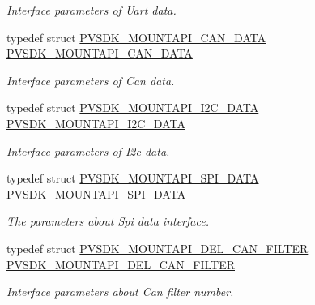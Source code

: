 \begin{DoxyCompactItemize}
\begin{DoxyCompactList}\small\item\em Interface parameters of Uart data. \end{DoxyCompactList}\item 
typedef struct \hyperlink{struct_p_v_s_d_k___m_o_u_n_t_a_p_i___c_a_n___d_a_t_a}{P\+V\+S\+D\+K\+\_\+\+M\+O\+U\+N\+T\+A\+P\+I\+\_\+\+C\+A\+N\+\_\+\+D\+A\+TA} \hyperlink{group___p_v_s_d_k___c_o_r_e___a_p_i___m_o_u_n_t_c_o_n_t_r_o_l_gab3b760a5b4221e28642d202e8d1b1d39}{P\+V\+S\+D\+K\+\_\+\+M\+O\+U\+N\+T\+A\+P\+I\+\_\+\+C\+A\+N\+\_\+\+D\+A\+TA}
\begin{DoxyCompactList}\small\item\em Interface parameters of Can data. \end{DoxyCompactList}\item 
typedef struct \hyperlink{struct_p_v_s_d_k___m_o_u_n_t_a_p_i___i2_c___d_a_t_a}{P\+V\+S\+D\+K\+\_\+\+M\+O\+U\+N\+T\+A\+P\+I\+\_\+\+I2\+C\+\_\+\+D\+A\+TA} \hyperlink{group___p_v_s_d_k___c_o_r_e___a_p_i___m_o_u_n_t_c_o_n_t_r_o_l_gaae12ef2e7bfbb4f7540409242ed7f07f}{P\+V\+S\+D\+K\+\_\+\+M\+O\+U\+N\+T\+A\+P\+I\+\_\+\+I2\+C\+\_\+\+D\+A\+TA}
\begin{DoxyCompactList}\small\item\em Interface parameters of I2c data. \end{DoxyCompactList}\item 
typedef struct \hyperlink{struct_p_v_s_d_k___m_o_u_n_t_a_p_i___s_p_i___d_a_t_a}{P\+V\+S\+D\+K\+\_\+\+M\+O\+U\+N\+T\+A\+P\+I\+\_\+\+S\+P\+I\+\_\+\+D\+A\+TA} \hyperlink{group___p_v_s_d_k___c_o_r_e___a_p_i___m_o_u_n_t_c_o_n_t_r_o_l_ga75ead11880120116504f69f893e91355}{P\+V\+S\+D\+K\+\_\+\+M\+O\+U\+N\+T\+A\+P\+I\+\_\+\+S\+P\+I\+\_\+\+D\+A\+TA}
\begin{DoxyCompactList}\small\item\em The parameters about Spi data interface. \end{DoxyCompactList}\item 
typedef struct \hyperlink{struct_p_v_s_d_k___m_o_u_n_t_a_p_i___d_e_l___c_a_n___f_i_l_t_e_r}{P\+V\+S\+D\+K\+\_\+\+M\+O\+U\+N\+T\+A\+P\+I\+\_\+\+D\+E\+L\+\_\+\+C\+A\+N\+\_\+\+F\+I\+L\+T\+ER} \hyperlink{group___p_v_s_d_k___c_o_r_e___a_p_i___m_o_u_n_t_c_o_n_t_r_o_l_ga4063354dae0aaaa36c666f41e2307f39}{P\+V\+S\+D\+K\+\_\+\+M\+O\+U\+N\+T\+A\+P\+I\+\_\+\+D\+E\+L\+\_\+\+C\+A\+N\+\_\+\+F\+I\+L\+T\+ER}
\begin{DoxyCompactList}\small\item\em Interface parameters about Can filter number. \end{DoxyCompactList}\item 

\end{DoxyCompactItemize}
